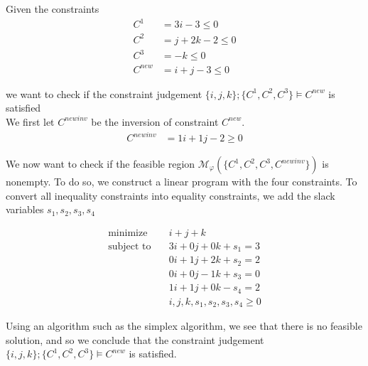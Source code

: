 \begin{examp}
    Given the constraints
    \begin{align*}
        C^1 &= 3i - 3 \leq 0\\
        C^2 &= j + 2k - 2 \leq 0\\
        C^3 &= -k \leq 0\\
        C^{new} &= i + j - 3 \leq 0
    \end{align*}
    
    we want to check if the constraint judgement $\{i, j, k\};\{C^1, C^2, C^3\} \vDash C^{new}$ is satisfied\\
    
    
    We first let $C^{newinv}$ be the inversion of constraint $C^{new}$.
    \begin{align*}
        C^{newinv} &= 1i + 1j - 2 \geq 0
    \end{align*}
    
    We now want to check if the feasible region $\mathcal{M}_\varphi(\{C^1, C^2, C^3, C^{newinv}\})$ is nonempty. To do so, we construct a linear program with the four constraints. To convert all inequality constraints into equality constraints, we add the slack variables $s_1, s_2, s_3, s_4$ 
    
    \begin{align*}
        \text{minimize}&\quad i + j + k\\
        \text{subject to}&\quad 3i + 0j + 0k + s_1 = 3\\
        &\quad 0i + 1j + 2k + s_2 = 2\\
        &\quad 0i + 0j - 1k + s_3 = 0\\
        &\quad 1i + 1j + 0k - s_4 = 2\\
        &\quad i, j, k, s_1, s_2, s_3, s_4 \geq 0
    \end{align*}
    
    Using an algorithm such as the simplex algorithm, we see that there is no feasible solution, and so we conclude that the constraint judgement $\{i, j, k\};\{C^1, C^2, C^3\} \vDash C^{new}$ is satisfied.
    
    
    
    
    

\end{examp}
